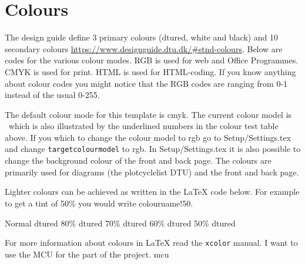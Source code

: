 \chapter{Colours} \label{sec:colours}
The design guide define 3 primary colours (dtured, white and black) and 10 secondary colours \url{https://www.designguide.dtu.dk/#stnd-colours}. Below are codes for the various colour modes. RGB is used for web and Office Programmes. CMYK is used for print. HTML is used for HTML-coding. If you know anything about colour codes you might notice that the RGB codes are ranging from 0-1 instead of the usual 0-255. 

\begin{testcolors}
\end{testcolors}

The default colour mode for this template is cmyk. The current colour model is \targetcolourmodel~which is also illustrated by the underlined numbers in the colour test table above.  If you which to change the colour model to rgb go to Setup/Settings.tex and change \texttt{targetcolourmodel} to rgb. In Setup/Settings.tex it is also possible to change the background colour of the front and back page. The colours are primarily used for diagrams (the plotcyclelist DTU) and the front and back page.

Lighter colours can be achieved as written in the \LaTeX{} code below. For example to get a tint of 50\% you would write colourname!50.  \newline
{\raggedright
\textcolor{dtured}{Normal dtured} \qquad
\textcolor{dtured!80}{80\% dtured} \qquad 
\textcolor{dtured!70}{70\% dtured} \qquad
\textcolor{dtured!60}{60\% dtured} \qquad
\textcolor{dtured!50}{50\% dtured} 
}
\newline
For more information about colours in \LaTeX{} read the \texttt{xcolor} manual. I want to use the MCU \cite{f411re} for the  part of the project. \gls{mcu}